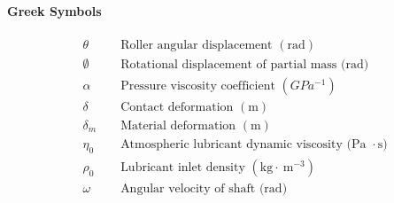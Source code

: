 \paragraph{Greek Symbols}
\begin{align*}
	&\theta && \text { Roller angular displacement }(\mathrm{rad}) \\
	&\emptyset && \text { Rotational displacement of partial mass (rad) } \\
	&\alpha && \text { Pressure viscosity coefficient }\left(GPa^{-1}\right) \\
	&\delta && \text { Contact deformation }(\mathrm{m}) \\
	&\delta_m && \text { Material deformation }(\mathrm{m}) \\
	&\eta_0 && \text { Atmospheric lubricant dynamic viscosity (Pa } \cdot \mathrm{s}) \\
	&\rho_0 && \text { Lubricant inlet density }\left(\mathrm{kg} \cdot \mathrm{~m}^{-3}\right) \\
	&\omega && \text { Angular velocity of shaft (rad) } \\
\end{align*}

